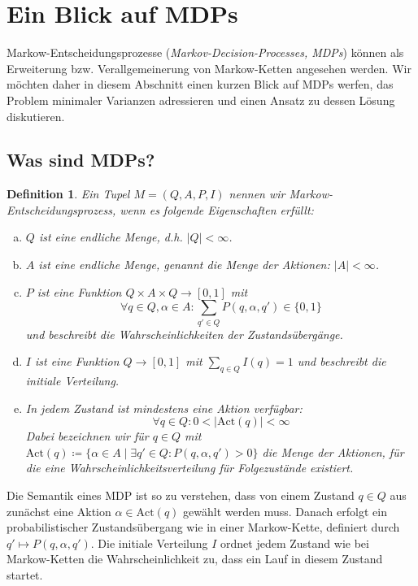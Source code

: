 \documentclass[a4paper]{article}
\newcommand{\mc}{Markow-Kette}
\newtheorem{definition}[satz]{Definition} %
\theoremstyle{nonumberplain}
\begin{document}
	
	\section{Ein Blick auf MDPs}
	
	Markow-Entscheidungsprozesse (\textit{Markov-Decision-Processes, MDPs}) können als Erweiterung bzw. Verallgemeinerung von \mc{}n angesehen werden. Wir möchten daher in diesem Abschnitt einen kurzen Blick auf MDPs werfen, das Problem minimaler Varianzen adressieren und einen Ansatz zu dessen Lösung diskutieren.
	
	\subsection{Was sind MDPs?}
	\newcommand{\mdpex}{$M = (Q,A,P,I)$}
	\newcommand{\mdp}{Mar\-kow-Ent\-schei\-dungs\-pro\-zess}
	\newcommand{\mact}{\mathrm{Act}}
	\begin{definition}\label{def-mdp}
		Ein Tupel \mdpex{} nennen wir \mdp{}, wenn es folgende Eigenschaften erfüllt:
		\begin{enumerate}[(a)]
			\item $Q$ ist eine endliche Menge, d.h. $|Q|<\infty$.
			\item $A$ ist eine endliche Menge, genannt die Menge der Aktionen: $|A| < \infty$.
			\item $P$ ist eine Funktion $Q \times A \times Q \to [0,1]$ mit
			\begin{equation}
			\forall q\in Q, \alpha\in A : \sum_{q' \in Q}{P(q,\alpha,q')} \in \{0,1\}
			\end{equation}
			und beschreibt die Wahrscheinlichkeiten der Zustandsübergänge.
			\item $I$ ist eine Funktion $Q \to [0,1]$ mit $\sum_{q \in Q}{I(q)} = 1$ und beschreibt die initiale Verteilung.
			\item In jedem Zustand ist mindestens eine Aktion verfügbar:
			\begin{equation}
			\forall q\in Q : 0 < | \mathrm{Act}(q) | < \infty
			\end{equation}
			Dabei bezeichnen wir für $q \in Q$ mit $\mathrm{Act}(q) \coloneqq \{\alpha \in A \mid \exists q' \in Q : P(q,\alpha,q') > 0\}$ die Menge der Aktionen, für die eine Wahrscheinlichkeitsverteilung für Folgezustände existiert. \label{item-b-270820}
		\end{enumerate}
	\end{definition}	
	Die Semantik eines MDP ist so zu verstehen, dass von einem Zustand $q \in Q$ aus zunächst eine Aktion $\alpha \in \mathrm{Act}(q)$ gewählt werden muss. Danach erfolgt ein probabilistischer Zustandsübergang wie in einer \mc{}, definiert durch $q' \mapsto P(q,\alpha,q')$. Die initiale Verteilung $I$ ordnet jedem Zustand wie bei \mc{}n die Wahrscheinlichkeit zu, dass ein Lauf in diesem Zustand startet.
\end{document}
